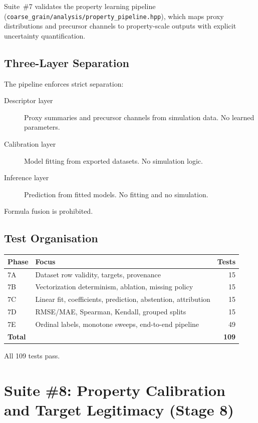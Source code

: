 \documentclass[11pt]{article}
\newcommand{\file}[1]{\texttt{#1}}
\begin{document}
Suite~\#7 validates the property learning pipeline
(\file{coarse\_grain/analysis/property\_pipeline.hpp}), which maps proxy
distributions and precursor channels to property-scale outputs with
explicit uncertainty quantification.

\subsection{Three-Layer Separation}

The pipeline enforces strict separation:
\begin{description}
    \item[Descriptor layer] Proxy summaries and precursor channels from
        simulation data.  No learned parameters.
    \item[Calibration layer] Model fitting from exported datasets.
        No simulation logic.
    \item[Inference layer] Prediction from fitted models.  No fitting
        and no simulation.
\end{description}

Formula fusion is prohibited.

\subsection{Test Organisation}

\begin{center}
\begin{tabular}{llr}
    \textbf{Phase} & \textbf{Focus} & \textbf{Tests} \\
    \midrule
    7A & Dataset row validity, targets, provenance & 15 \\
    7B & Vectorization determinism, ablation, missing policy & 15 \\
    7C & Linear fit, coefficients, prediction, abstention, attribution & 15 \\
    7D & RMSE/MAE, Spearman, Kendall, grouped splits & 15 \\
    7E & Ordinal labels, monotone sweeps, end-to-end pipeline & 49 \\
    \midrule
    \textbf{Total} & & \textbf{109} \\
\end{tabular}
\end{center}

All 109 tests pass.

\section{Suite \#8: Property Calibration and Target Legitimacy (Stage 8)}
\label{sec:suite8}
\end{document}

